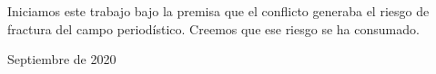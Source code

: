 {Iniciamos este trabajo bajo la premisa que el conflicto generaba el riesgo de fractura del campo periodístico. Creemos que ese riesgo se ha consumado.

Septiembre de 2020

%
%
%
%
%
%
%
%
%
%
%
%
}
